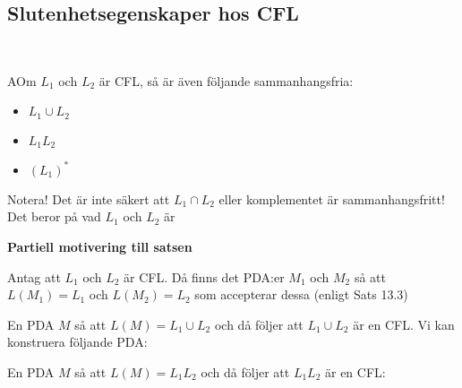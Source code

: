 \subsection{Slutenhetsegenskaper hos CFL}\hfill\\\par
\begin{theo}
  AOm $L_1$ och $L_2$ är CFL, så är även följande sammanhangsfria:\par
  \begin{itemize}
    \item $L_1\cup L_2$
    \item $L_1L_2$
    \item $(L_1)^*$
  \end{itemize}\par
  \par\bigskip
  \noindent Notera! Det är inte säkert att $L_1\cap L_2$ eller komplementet är sammanhangsfritt! Det beror på vad $L_1$ och $L_2$ är 
\end{theo}
\par\bigskip
\noindent\textbf{Partiell motivering till satsen}
\par\bigskip
\noindent Antag att $L_1$ och $L_2$ är CFL. Då finns det PDA:er $M_1$ och $M_2$ så att $L(M_1) = L_1$ och $L(M_2) = L_2$ som accepterar dessa (enligt Sats 13.3)
\par\bigskip
\noindent En PDA $M$ så att $L(M) = L_1\cup L_2$ och då följer att $L_1\cup L_2$ är en CFL. Vi kan konstruera följande PDA:
\begin{figure}[ht!]
    \centering
    \caption{}
\end{figure}
\par\bigskip
\noindent En PDA $M$ så att $L(M) = L_1L_2$ och då följer att $L_1L_2$ är en CFL:
\begin{figure}[ht!]
    \centering
    \caption{}
\end{figure}
